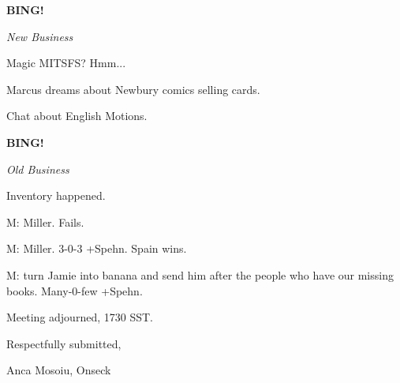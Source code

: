 \documentclass[12pt]{article}
\newcommand{\bing}{{\bf BING!} }
\newcommand{\goto}[1]{\bing \vskip 12pt \centerline{{\em{#1}}}}
\begin{document}
\goto{New Business}

Magic MITSFS? Hmm...

Marcus dreams about Newbury comics selling cards.

Chat about English Motions.

\goto{Old Business}

Inventory happened.

M: Miller. Fails.

M: Miller. 3-0-3 +Spehn. Spain wins.

M: turn Jamie into banana and send him after the people who have our missing books. Many-0-few +Spehn.

\vspace{12pt}

\noindent
Meeting adjourned, 1730 SST.

\vspace{18pt}

\centerline{Respectfully submitted,}
\centerline{Anca Mosoiu, Onseck}
\end{document}
